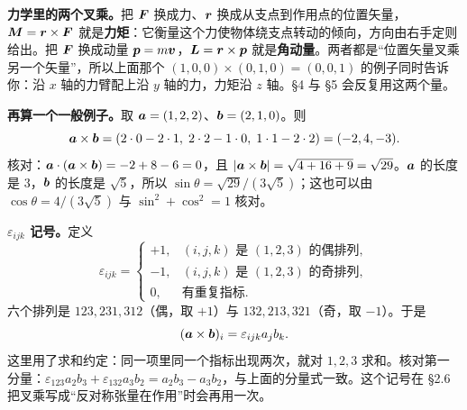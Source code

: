 \documentclass[11pt]{ctexart}
\begin{document}
\textbf{力学里的两个叉乘。}把 $\boldsymbol{F}$ 换成力、$\boldsymbol{r}$ 换成从支点到作用点的位置矢量，$\boldsymbol{M}=\boldsymbol{r}\times\boldsymbol{F}$ 就是\textbf{力矩}：它衡量这个力使物体绕支点转动的倾向，方向由右手定则给出。把 $\boldsymbol{F}$ 换成动量 $\boldsymbol{p}=m\boldsymbol{v}$，$\boldsymbol{L}=\boldsymbol{r}\times\boldsymbol{p}$ 就是\textbf{角动量}。两者都是“位置矢量叉乘另一个矢量”，所以上面那个 $(1,0,0)\times(0,1,0)=(0,0,1)$ 的例子同时告诉你：沿 $x$ 轴的力臂配上沿 $y$ 轴的力，力矩沿 $z$ 轴。\S4 与 \S5 会反复用这两个量。

\textbf{再算一个一般例子。}取 $\boldsymbol{a}=(1,2,2)$、$\boldsymbol{b}=(2,1,0)$。则
\[
\boldsymbol{a}\times\boldsymbol{b}=(2\cdot0-2\cdot1,\;2\cdot2-1\cdot0,\;1\cdot1-2\cdot2)=(-2,4,-3).
\]
核对：$\boldsymbol{a}\cdot(\boldsymbol{a}\times\boldsymbol{b})=-2+8-6=0$，且 $|\boldsymbol{a}\times\boldsymbol{b}|=\sqrt{4+16+9}=\sqrt{29}$。$\boldsymbol{a}$ 的长度是 $3$，$\boldsymbol{b}$ 的长度是 $\sqrt5$，所以 $\sin\theta=\sqrt{29}/(3\sqrt5)$；这也可以由 $\cos\theta=4/(3\sqrt5)$ 与 $\sin^2+\cos^2=1$ 核对。

\textbf{$\varepsilon_{ijk}$ 记号。}定义
\[
\varepsilon_{ijk}=
\begin{cases}
+1,&(i,j,k)\text{ 是 }(1,2,3)\text{ 的偶排列},\\
-1,&(i,j,k)\text{ 是 }(1,2,3)\text{ 的奇排列},\\
0,&\text{有重复指标}.
\end{cases}
\]
六个排列是 $123,231,312$（偶，取 $+1$）与 $132,213,321$（奇，取 $-1$）。于是
\[
(\boldsymbol{a}\times\boldsymbol{b})_i=\varepsilon_{ijk}a_jb_k .
\]
这里用了求和约定：同一项里同一个指标出现两次，就对 $1,2,3$ 求和。核对第一分量：$\varepsilon_{123}a_2b_3+\varepsilon_{132}a_3b_2=a_2b_3-a_3b_2$，与上面的分量式一致。这个记号在 \S2.6 把叉乘写成“反对称张量在作用”时会再用一次。

\end{document}
